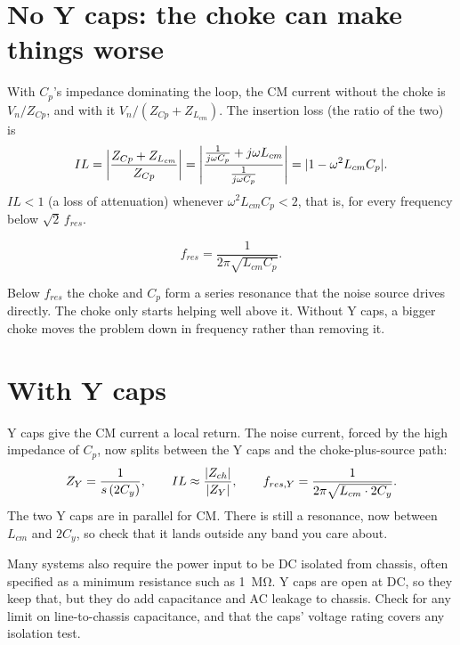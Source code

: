 \section{No Y caps: the choke can make things worse}

\begin{derivation}
	With $C_p$'s impedance dominating the loop, the CM current without the choke
	is $V_n/Z_{Cp}$, and with it $V_n/(Z_{Cp} + Z_{L_{cm}})$. The insertion loss
	(the ratio of the two) is
	\[
		IL = \abs*{\frac{Z_{Cp} + Z_{L_{cm}}}{Z_{Cp}}}
		= \abs*{\frac{\frac{1}{j\omega C_p} + j\omega L_{cm}}{\frac{1}{j\omega C_p}}}
		= \abs{1 - \omega^2 L_{cm} C_p}.
	\]
	$IL < 1$ (a loss of attenuation) whenever $\omega^2L_{cm}C_p < 2$, that is,
	for every frequency below $\sqrt{2}\,f_{res}$.
\end{derivation}

\begin{equation}\label{eq:cm-res}
	f_{res} = \frac{1}{2\pi\sqrt{L_{cm}C_p}}.
\end{equation}

\begin{idea}
	Below $f_{res}$ the choke and $C_p$ form a series resonance that the noise
	source drives directly. The choke only starts helping well above it.
	Without Y caps, a bigger choke moves the problem down in frequency rather
	than removing it.
\end{idea}

\section{With Y caps}

Y caps give the CM current a local return. The noise current, forced by the
high impedance of $C_p$, now splits between the Y caps and the choke-plus-source path:
\[
	Z_Y = \frac{1}{s\,(2C_y)}, \qquad
	IL \approx \frac{\abs{Z_{ch}}}{\abs{Z_Y}}, \qquad
	f_{res,Y} = \frac{1}{2\pi\sqrt{L_{cm}\cdot 2C_y}}.
\]
The two Y caps are in parallel for CM. There is still a resonance, now
between $L_{cm}$ and $2C_y$, so check that it lands outside any band you care about.

Many systems also require the power input to be DC isolated from chassis,
often specified as a minimum resistance such as \qty{1}{\mega\ohm}. Y caps are
open at DC, so they keep that, but they do add capacitance and AC leakage to
chassis. Check for any limit on line-to-chassis capacitance, and that the
caps' voltage rating covers any isolation test.

